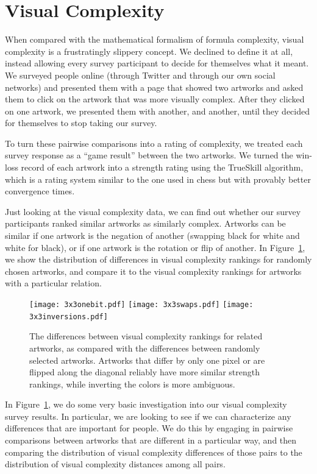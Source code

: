 \documentclass[11pt]{article}
\begin{document}
\section*{Visual Complexity}

When compared with the mathematical formalism of formula complexity, visual
complexity is a frustratingly slippery concept.  We declined to define it at
all, instead allowing every survey participant to decide for themselves what it
meant.  We surveyed people online (through Twitter and through our own social
networks) and presented them with a page that showed two artworks and asked
them to click on the artwork that was more visually complex.  After they
clicked on one artwork, we presented them with another, and another, until
they decided for themselves to stop taking our survey.

To turn these pairwise comparisons into a rating of complexity,
we treated each survey response as a ``game result'' between the
two artworks. We turned the win-loss record of each artwork into a
strength rating using the TrueSkill algorithm\cite{trueskill}, which is a
rating system similar to the one used in chess but with provably better
convergence times.

Just looking at the visual complexity data, we can find out whether our survey
participants ranked similar artworks as similarly complex.  Artworks can be
similar if one artwork is the negation of another (swapping black for white and
white for black), or if one artwork is the rotation or flip of another.  In
Figure~\ref{fig:differences}, we show the distribution of differences in visual
complexity rankings for randomly chosen artworks, and compare it to the visual
complexity rankings for artworks with a particular relation.

\begin{figure}
\begin{center}
\texttt{[image: 3x3onebit.pdf]} 
\texttt{[image: 3x3swaps.pdf]} 
\texttt{[image: 3x3inversions.pdf]}
\end{center}

\caption{The differences between visual complexity rankings for related artworks, as compared with the differences between randomly selected artworks.  Artworks that differ by only one pixel or are flipped along the diagonal reliably have more similar strength rankings, while inverting the colors is more ambiguous.}
\label{fig:differences}
\end{figure}

In Figure~\ref{fig:differences}, we do some very basic investigation into our
visual complexity survey results.  In particular, we are looking to see if we
can characterize any differences that are important for people.  We do this by
engaging in pairwise comparisons between artworks that are different in a
particular way, and then comparing the distribution of visual complexity
differences of those pairs to the distribution of visual complexity distances
among all pairs.
\end{document}
